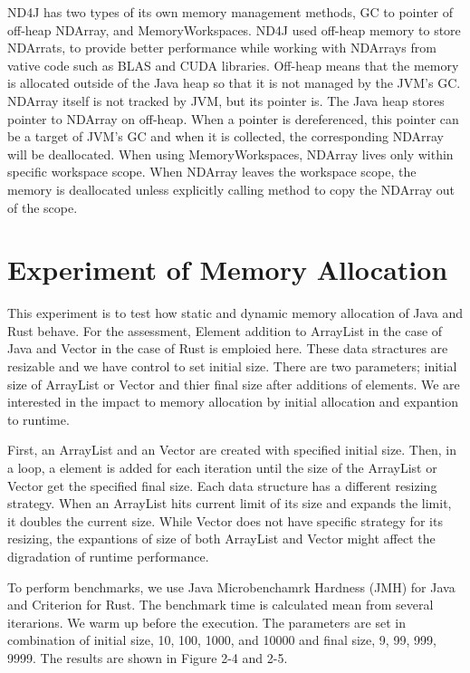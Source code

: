 ND4J has two types of  its own memory management methods, GC to pointer of off-heap NDArray, and MemoryWorkspaces. 
ND4J used off-heap memory to store NDArrats, to provide better performance while working with NDArrays from vative code such as BLAS and CUDA libraries. 
Off-heap means that the memory is allocated outside of the Java heap so that it is not managed by the JVM’s GC. NDArray itself is not tracked by JVM, 
but its pointer is. The Java heap stores pointer to NDArray on off-heap. When a pointer is dereferenced, this pointer can be a target of JVM’s GC and when it is collected, 
the corresponding NDArray will be deallocated. When using MemoryWorkspaces, NDArray lives only within specific workspace scope. 
When NDArray leaves the workspace scope, the memory is deallocated unless explicitly calling method to copy the NDArray out of the scope.



\section{Experiment of Memory Allocation}
\label{sec:history}
This experiment is to test how static and dynamic memory allocation of Java and Rust behave. For the assessment, Element addition to ArrayList in the case of Java and Vector in the case of Rust 
is emploied here. These data stractures are resizable and we have control to set initial size. There are two parameters; initial size of ArrayList or Vector and thier final size after additions of elements. 
We are interested in the impact to memory allocation by initial allocation and expantion to runtime.

First, an ArrayList and an Vector are created with specified initial size. Then, in a loop, a element is added for each iteration until the size of the ArrayList or Vector get the specified final size. 
Each data structure has a different resizing strategy. When an ArrayList hits current limit of its size and expands the limit, it doubles the current size.  
While Vector does not have specific strategy for its resizing, the expantions of size of both ArrayList and Vector might affect the digradation of runtime performance.

To perform benchmarks, we use Java Microbenchamrk Hardness (JMH) for Java and Criterion for Rust. The benchmark time is calculated mean from several iterarions. 
We warm up before the execution. The parameters are set in combination of initial size, 10, 100, 1000, and 10000 and final size, 9, 99, 999, 9999. 
The results are shown in Figure 2-4 and 2-5. 

